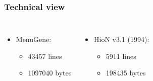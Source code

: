 \documentclass[12pt]{beamer}
\begin{document}
\begin{frame}
\frametitle{Technical view}

\begin{columns}[totalwidth=\linewidth]

\begin{itemize}
\item	MenuGene:\par
	\begin{itemize}
	\item	43457 lines
	\item	1097040 bytes
	\end{itemize}
\end{itemize}
\begin{itemize}
\item	\color{gray!60}
	HioN v3.1 (1994):\par
	\begin{itemize}
	\color{gray!60}
	\item	5911 lines
	\item	198435 bytes
	\end{itemize}
\end{itemize}
\end{columns}


\end{frame}
\end{document}
